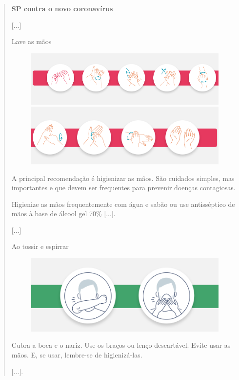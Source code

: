 \begin{quote}
\textbf{SP contra o novo coronavírus}

{[}...{]}

Lave as mãos

\begin{figure}[htpb!]
\includegraphics[width=.5\textwidth]{./imgs/img12.jpg}
\includegraphics[width=.5\textwidth]{./imgs/img13.jpg}
\end{figure}

A principal recomendação é higienizar as mãos. São cuidados simples,
mas importantes e que devem ser frequentes para prevenir doenças
contagiosas.

Higienize as mãos frequentemente com água e sabão ou use antisséptico de
mãos à base de álcool gel 70\% {[}...{]}.

{[}...{]}

Ao tossir e espirrar

\begin{figure}[htpb!]
\includegraphics[width=.5\textwidth]{./imgs/img14.jpg}
\end{figure}

Cubra a boca e o nariz. Use os braços ou lenço descartável. Evite usar
as mãos. E, se usar, lembre-se de higienizá-las.

{[}...{]}.

\end{quote}

